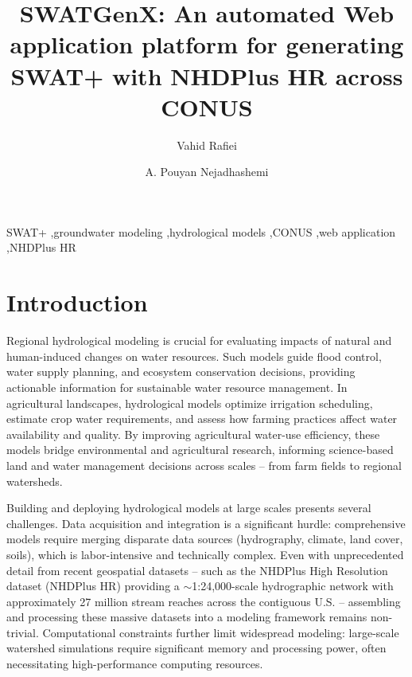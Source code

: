 \documentclass[final,3p,times]{elsarticle}
\begin{document}
\begin{frontmatter}

\title{SWATGenX: An automated Web application platform for generating SWAT+ with NHDPlus HR across CONUS}

\author[1]{Vahid Rafiei}
\author[1]{A. Pouyan Nejadhashemi}
\address[1]{Department of Biosystems and Agricultural Engineering, Michigan State University (MSU), USA}

\begin{abstract}
\end{abstract}

\begin{keyword}
SWAT+ \sep groundwater modeling \sep hydrological models \sep CONUS \sep web application \sep NHDPlus HR
\end{keyword}

\end{frontmatter}


\section{Introduction}
\label{sec:introduction}

Regional hydrological modeling is crucial for evaluating impacts of natural and human-induced changes on water resources. Such models guide flood control, water supply planning, and ecosystem conservation decisions, providing actionable information for sustainable water resource management. In agricultural landscapes, hydrological models optimize irrigation scheduling, estimate crop water requirements, and assess how farming practices affect water availability and quality. By improving agricultural water-use efficiency, these models bridge environmental and agricultural research, informing science-based land and water management decisions across scales -- from farm fields to regional watersheds.

Building and deploying hydrological models at large scales presents several challenges. Data acquisition and integration is a significant hurdle: comprehensive models require merging disparate data sources (hydrography, climate, land cover, soils), which is labor-intensive and technically complex. Even with unprecedented detail from recent geospatial datasets -- such as the NHDPlus High Resolution dataset (NHDPlus HR) providing a $\sim$1:24,000-scale hydrographic network with approximately 27 million stream reaches across the contiguous U.S. -- assembling and processing these massive datasets into a modeling framework remains non-trivial. Computational constraints further limit widespread modeling: large-scale watershed simulations require significant memory and processing power, often necessitating high-performance computing resources.
\end{document}
